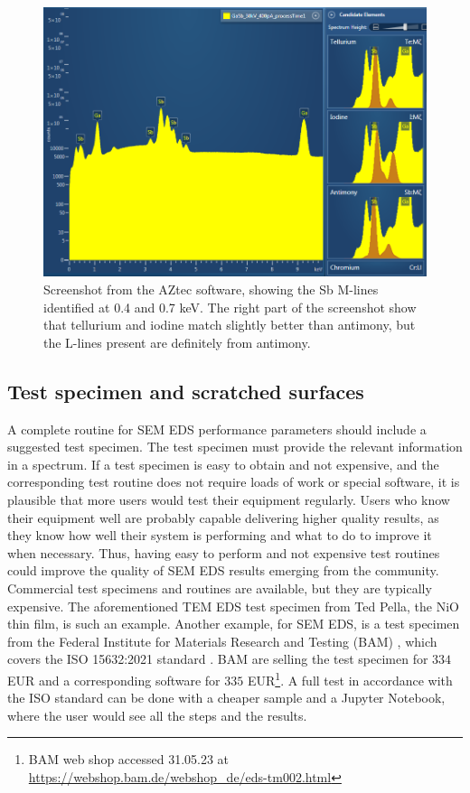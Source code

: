 \begin{figure}[htbp]
    \centering
    \includegraphics[width=0.99\linewidth]{figures/discussion/AZtec_Mlines.png}
    \caption{
        Screenshot from the AZtec software, showing the Sb M-lines identified at 0.4 and 0.7 keV.
        The right part of the screenshot show that tellurium and iodine match slightly better than antimony, but the L-lines present are definitely from antimony.
    }
    \label{fig:discussion:AZtec_Mlines}
\end{figure}





\subsection{Test specimen and scratched surfaces}
\label{discussion:test_specimen}

A complete routine for SEM EDS performance parameters should include a suggested test specimen.
The test specimen must provide the relevant information in a spectrum.
If a test specimen is easy to obtain and not expensive, and the corresponding test routine does not require loads of work or special software, it is plausible that more users would test their equipment regularly.
Users who know their equipment well are probably capable delivering higher quality results, as they know how well their system is performing and what to do to improve it when necessary.
Thus, having easy to perform and not expensive test routines could improve the quality of SEM EDS results emerging from the community.
Commercial test specimens and routines are available, but they are typically expensive.
The aforementioned TEM EDS test specimen from Ted Pella, the NiO thin film, is such an example.
Another example, for SEM EDS, is a test specimen from the Federal Institute for Materials Research and Testing (BAM) \cite{rackwitz_2015_bam}, which covers the ISO 15632:2021 standard \cite{iso_qc_15632}.
BAM are selling the test specimen for  $334$ EUR and a corresponding software for $335$ EUR\footnote{BAM web shop accessed 31.05.23 at \url{https://webshop.bam.de/webshop_de/eds-tm002.html}}.
A full test in accordance with the ISO standard can be done with a cheaper sample and a Jupyter Notebook, where the user would see all the steps and the results.

